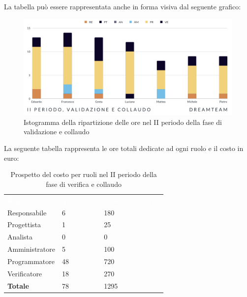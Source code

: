 La tabella può essere rappresentata anche in forma visiva dal seguente grafico:
\begin{figure}[H]
\centering
\includegraphics[scale=0.65]{Sezioni/SezioniPreventivo/grafici/Validazione_collaudo_II_periodo.png}
\caption{Istogramma della ripartizione delle ore nel II periodo della fase di validazione e collaudo}
\end{figure}

La seguente tabella rappresenta le ore totali dedicate ad ogni ruolo e il costo in euro:

\begin{table}[H]
\begin{center}
\renewcommand{\arraystretch}{1.5}
\begin{tabular}{ m{}<{\centering}  m{}<{\centering} m{}<{\centering}}
	\rowcolor{darkblue}
	\textcolor{white}{\textbf{Ruolo}}&\textcolor{white}{\textbf{Totale ore}}&\textcolor{white}{\textbf{Costo totale (\euro)}}\\ 

	Responsabile  & 6 & 180 \\	
	
	Progettista & 1 & 25 \\
	
	Analista & 0 & 0 \\

	Amministratore & 5 & 100 \\
	
	Programmatore & 48 & 720 \\
	
	Verificatore & 18 & 270 \\
	
	\textbf{Totale} & 78 & 1295 \\
	
\end{tabular}
\caption{Prospetto del costo per ruoli nel II periodo della fase di verifica e collaudo}
\end{center}
\end{table}

